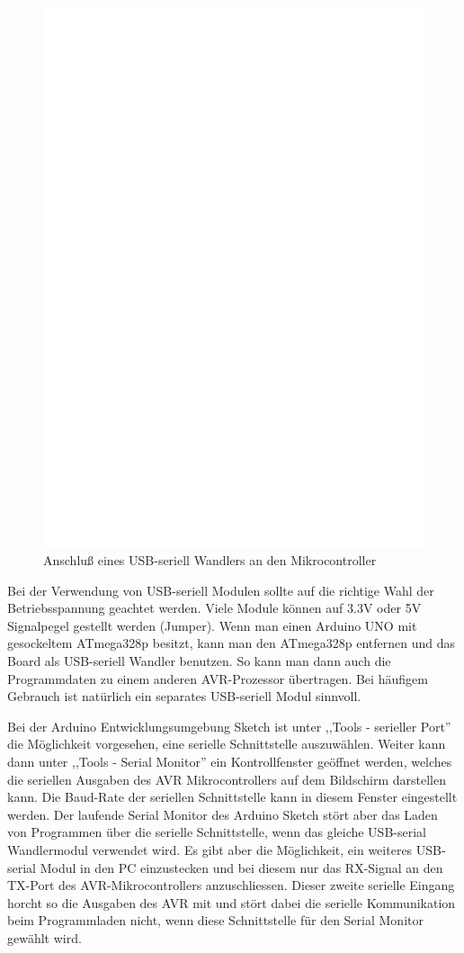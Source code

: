 \begin{figure}[H]
\centering
\includegraphics[width=12cm]{../FIG/UM232.eps}
\caption{Anschluß eines USB-seriell Wandlers an den Mikrocontroller}
\label{fig:UM232}
\end{figure}

Bei der Verwendung von USB-seriell Modulen sollte auf die richtige Wahl der Betriebsspannung
geachtet werden. Viele Module können auf 3.3V oder 5V Signalpegel gestellt werden (Jumper).
Wenn man einen Arduino UNO mit gesockeltem ATmega328p besitzt, kann man den ATmega328p 
entfernen und das Board als USB-seriell Wandler benutzen. 
So kann man dann auch die Programmdaten zu einem anderen AVR-Prozessor übertragen.
Bei häufigem Gebrauch ist natürlich ein separates USB-seriell Modul sinnvoll.

Bei der Arduino Entwicklungsumgebung Sketch ist unter ,,Tools - serieller Port'' die Möglichkeit vorgesehen,
eine serielle Schnittstelle auszuwählen. Weiter kann dann unter ,,Tools - Serial Monitor'' ein Kontrollfenster
geöffnet werden, welches die seriellen Ausgaben des AVR Mikrocontrollers auf dem Bildschirm darstellen
kann. Die Baud-Rate der seriellen Schnittstelle kann in diesem Fenster eingestellt werden.
Der laufende Serial Monitor des Arduino Sketch stört aber das Laden von Programmen über die serielle
Schnittstelle, wenn das gleiche USB-serial Wandlermodul verwendet wird.
Es gibt aber die Möglichkeit, ein weiteres USB-serial Modul in den PC einzustecken und bei diesem
nur das RX-Signal an den TX-Port des AVR-Mikrocontrollers anzuschliessen.
Dieser zweite serielle Eingang horcht so die Ausgaben des AVR mit und stört dabei die serielle 
Kommunikation beim Programmladen nicht, wenn diese Schnittstelle für den Serial Monitor gewählt wird.

